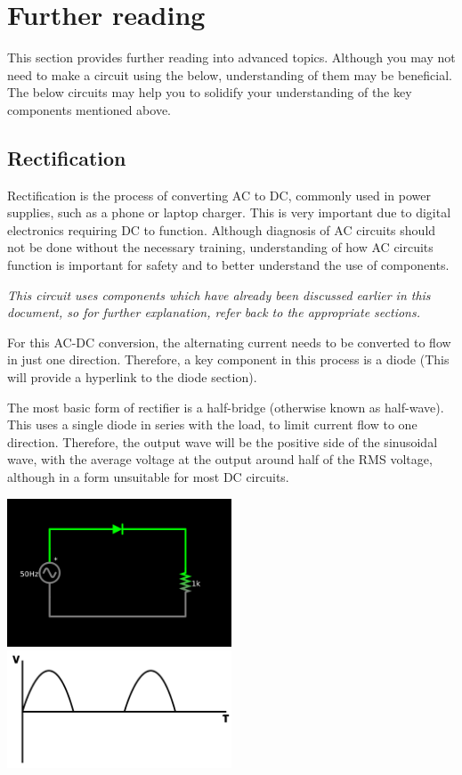 \documentclass[a4paper,11pt]{report}
\newcommand{\Theory}[1] %
{
\phantomsection %
\todo[inline, color=green!30]{\textbf{#1}} %
\vspace{1em} %
}
\begin{document}
\section{Further reading}

This section provides further reading into advanced topics. Although you may not need to make a circuit using the below, understanding of them may be beneficial. The below circuits may help you to solidify your understanding of the key components mentioned above.

\subsection{Rectification}

\Theory{What is Rectification?}

Rectification is the process of converting AC to DC, commonly used in power supplies, such as a phone or laptop charger. This is very important due to digital electronics requiring DC to function. Although diagnosis of AC circuits should not be done without the necessary training, understanding of how AC circuits function is important for safety and to better understand the use of components.

\textit{This circuit uses components which have already been discussed earlier in this document, so for further explanation, refer back to the appropriate sections.}

For this AC-DC conversion, the alternating current needs to be converted to flow in just one direction. Therefore, a key component in this process is a diode (This will provide a hyperlink to the diode section).

The most basic form of rectifier is a half-bridge (otherwise known as half-wave). This uses a single diode in series with the load, to limit current flow to one direction. Therefore, the output wave will be the positive side of the sinusoidal wave, with the average voltage at the output around half of the RMS voltage, although in a form unsuitable for most DC circuits.

\vspace*{1\baselineskip}

\includegraphics[width=0.5\textwidth]{halfbridge}
\includegraphics[width=0.5\textwidth]{halfbridgewave}
\end{document}
